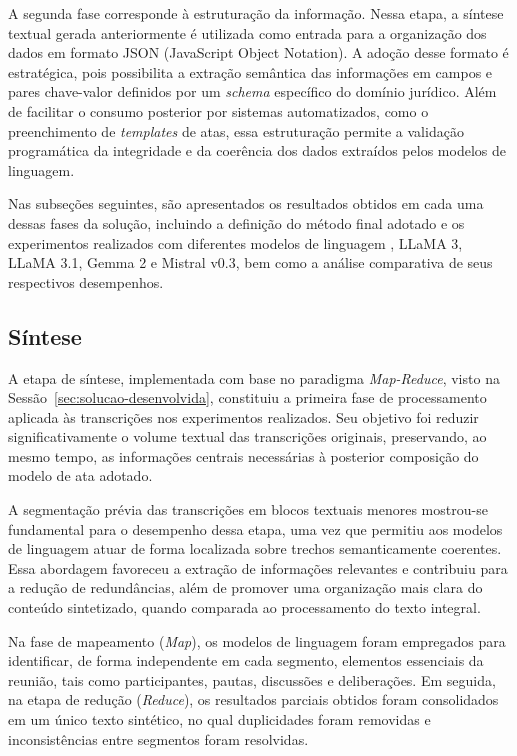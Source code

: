 A segunda fase corresponde à estruturação da informação. Nessa etapa, a síntese textual gerada anteriormente é utilizada como entrada para a organização dos dados em formato JSON (JavaScript Object Notation). A adoção desse formato é estratégica, pois possibilita a extração semântica das informações em campos e pares chave-valor definidos por um \textit{schema} específico do domínio jurídico. Além de facilitar o consumo posterior por sistemas automatizados, como o preenchimento de \textit{templates} de atas, essa estruturação permite a validação programática da integridade e da coerência dos dados extraídos pelos modelos de linguagem.

Nas subseções seguintes, são apresentados os resultados obtidos em cada uma dessas fases da solução, incluindo a definição do método final adotado e os experimentos realizados com diferentes modelos de linguagem , LLaMA 3, LLaMA 3.1, Gemma 2 e Mistral v0.3, bem como a análise comparativa de seus respectivos desempenhos.

\subsection{Síntese}
\label{sec:solucao-desenvolvida-introducao-sintese}

A etapa de síntese, implementada com base no paradigma \textit{Map-Reduce}, visto na Sessão~\ref{sec:solucao-desenvolvida}, constituiu a primeira fase de processamento aplicada às transcrições nos experimentos realizados. Seu objetivo foi reduzir significativamente o volume textual das transcrições originais, preservando, ao mesmo tempo, as informações centrais necessárias à posterior composição do modelo de ata adotado.

A segmentação prévia das transcrições em blocos textuais menores mostrou-se fundamental para o desempenho dessa etapa, uma vez que permitiu aos modelos de linguagem atuar de forma localizada sobre trechos semanticamente coerentes. Essa abordagem favoreceu a extração de informações relevantes e contribuiu para a redução de redundâncias, além de promover uma organização mais clara do conteúdo sintetizado, quando comparada ao processamento do texto integral.

Na fase de mapeamento (\textit{Map}), os modelos de linguagem foram empregados para identificar, de forma independente em cada segmento, elementos essenciais da reunião, tais como participantes, pautas, discussões e deliberações. Em seguida, na etapa de redução (\textit{Reduce}), os resultados parciais obtidos foram consolidados em um único texto sintético, no qual duplicidades foram removidas e inconsistências entre segmentos foram resolvidas.

